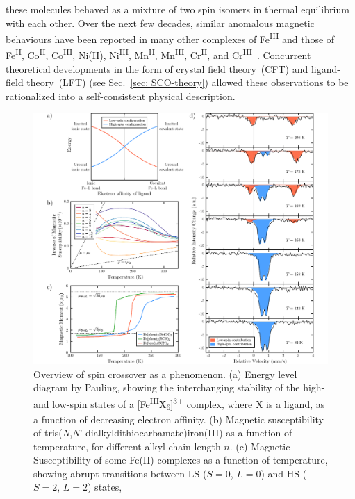 these molecules behaved as a mixture of two spin isomers
in thermal equilibrium with each other.
%
Over the next few decades, similar anomalous magnetic behaviours have been reported
in many other complexes of Fe\textsuperscript{III} and
those of Fe\textsuperscript{II}, Co\textsuperscript{II}, Co\textsuperscript{III},
Ni(II), Ni\textsuperscript{III}, Mn\textsuperscript{II}, Mn\textsuperscript{III}, Cr\textsuperscript{II},
and Cr\textsuperscript{III}~\cite{SCO-II}.
%
Concurrent theoretical developments in the form of crystal field theory~(CFT)
and ligand-field theory~(LFT)
(see Sec.~\ref{sec: SCO-theory}) allowed these observations to be
rationalized into a self-consistent physical description.

\begin{figure}[t!]
  \centering
  \includegraphics[width = \textwidth]{Figures/fig_SCO_overview.pdf}
  \caption[Overview of spin crossover as a phenomenon.]{
    Overview of spin crossover as a phenomenon.
    (a) Energy level diagram by Pauling, showing the interchanging stability
    of the high- and low-spin states of
    a [Fe\textsuperscript{III}X\textsubscript{6}]\textsuperscript{3+} complex,
    where X is a ligand, as a function of decreasing electron affinity.
    (b) Magnetic susceptibility of tris(\textit{N},\textit{N}'-dialkyldithiocarbamate)iron(III)
    as a function of temperature, for different alkyl chain length $n$.
    (c) Magnetic Susceptibility of some Fe(II) complexes as a function of temperature,
    showing abrupt transitions between LS ($S = 0$, $L = 0$) and HS ($S = 2$, $L = 2$) states,
}
\end{figure}
